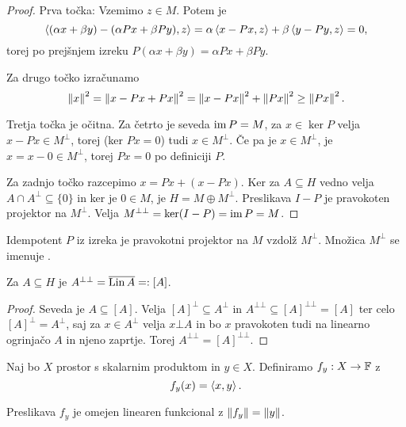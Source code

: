 \begin{proof}
  Prva točka:
  Vzemimo $z \in M$.
  Potem je
  \[
	\left< (\alpha x + \beta y) - (\alpha Px + \beta Py), z \right>
	= \alpha \left< x - Px, z \right> + \beta \left< y - Py, z \right>
	= 0,
  \]
  torej po prejšnjem izreku $P(\alpha x + \beta y) = \alpha P x + \beta P y$.

  Za drugo točko izračunamo
  \[
	\left\lVert x\right\rVert^2 = \left\lVert x - Px + Px\right\rVert^2 = \left\lVert x - Px\right\rVert^2 + \left\lVert Px\right\rVert^2 \ge
	\left\lVert Px\right\rVert^2.
  \]

  Tretja točka je očitna.
  Za četrto je seveda $\operatorname{im} P = M$, za $x \in \ker P$ velja $x - Px \in M^\bot$,
  torej (ker $Px = 0$) tudi $x \in M^\bot$.
  Če pa je $x \in M^\bot$, je $x = x - 0 \in M^\bot$, torej $Px = 0$ po
  definiciji $P$.

  Za zadnjo točko razcepimo $x = Px + (x -Px)$.
  Ker za $A \subseteq H$ vedno velja $A \cap A^\bot \subseteq \{0\}$ in ker je
  $0 \in M$, je $H = M \oplus M^\bot$.
  Preslikava $I - P$ je pravokoten projektor na $M^\bot$.
  Velja $M^{\bot \bot} = \operatorname{ker} (I-P) = \operatorname{im} P = M$.
\end{proof}


Idempotent $P$ iz izreka je pravokotni projektor na $M$ vzdolž $M^\bot$.
Množica $M^\bot$ se imenuje .

\begin{posledica}
  Za $A \subseteq H$ je $A^{\bot \bot} = \overline{\operatorname{Lin} A} =: [A]$.
\end{posledica}

\begin{proof}
  Seveda je $A \subseteq [A]$.
  Velja $[A]^\bot \subseteq A^\bot$ in $A^{\bot \bot} \subseteq [A]^{\bot \bot}
  = [A]$ ter celo $[A]^\bot = A^\bot$, saj za $x \in A^\bot$ velja $x \bot A$
  in bo $x$ pravokoten tudi na linearno ogrinjačo $A$ in njeno zaprtje.
  Torej $A^{\bot \bot} = [A]^{\bot \bot}$.
\end{proof}


Naj bo $X$ prostor s skalarnim produktom in $y \in X$.
Definiramo $f_y: X \to \mathbb{F}$ z
\[
  f_y(x) = \left< x,y \right>.
\]

\begin{lema}
  Preslikava $f_y$ je omejen linearen funkcional z $\left\lVert f_y\right\rVert = \left\lVert y\right\rVert$.
\end{lema}

